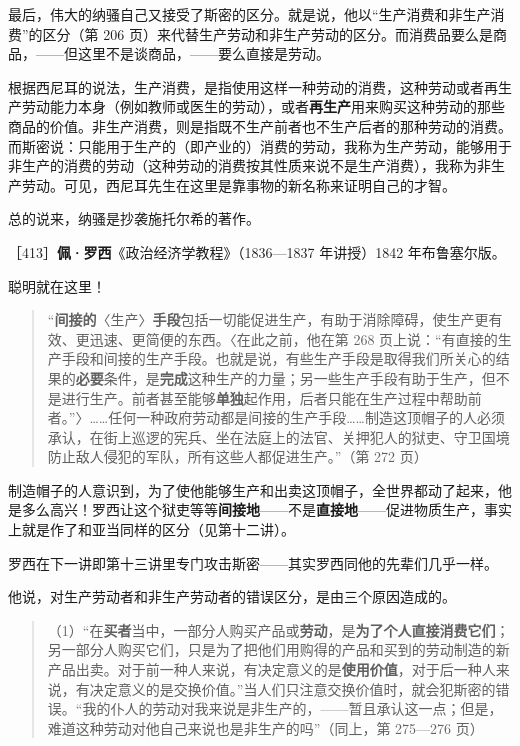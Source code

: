 最后，伟大的纳骚自己又接受了斯密的区分。就是说，他以“生产消费和非生产消费”的区分（第 206 页）来代替生产劳动和非生产劳动的区分。而消费品要么是商品，——但这里不是谈商品，——要么直接是劳动。

根据西尼耳的说法，生产消费，是指使用这样一种劳动的消费，这种劳动或者再生产劳动能力本身（例如教师或医生的劳动），或者\textbf{再生产}用来购买这种劳动的那些商品的价值。非生产消费，则是指既不生产前者也不生产后者的那种劳动的消费。而斯密说：只能用于生产的（即产业的）消费的劳动，我称为生产劳动，能够用于非生产的消费的劳动（这种劳动的消费按其性质来说不是生产消费），我称为非生产劳动。可见，西尼耳先生在这里是靠事物的新名称来证明自己的才智。

总的说来，纳骚是抄袭施托尔希的著作。


［413］\textbf{佩·罗西}《政治经济学教程》（1836—1837 年讲授）1842 年布鲁塞尔版。

聪明就在这里！

\begin{quote}“\textbf{间接的}〈生产〉\textbf{手段}包括一切能促进生产，有助于消除障碍，使生产更有效、更迅速、更简便的东西。〈在此之前，他在第 268 页上说：“有直接的生产手段和间接的生产手段。也就是说，有些生产手段是取得我们所关心的结果的\textbf{必要}条件，是\textbf{完成}这种生产的力量；另一些生产手段有助于生产，但不是进行生产。前者甚至能够\textbf{单独}起作用，后者只能在生产过程中帮助前者。”〉……任何一种政府劳动都是间接的生产手段……制造这顶帽子的人必须承认，在街上巡逻的宪兵、坐在法庭上的法官、关押犯人的狱吏、守卫国境防止敌人侵犯的军队，所有这些人都促进生产。”（第 272 页）\end{quote}

制造帽子的人意识到，为了使他能够生产和出卖这顶帽子，全世界都动了起来，他是多么高兴！罗西让这个狱吏等等\textbf{间接地}——不是\textbf{直接地}——促进物质生产，事实上就是作了和亚当同样的区分（见第十二讲）。

罗西在下一讲即第十三讲里专门攻击斯密——其实罗西同他的先辈们几乎一样。

他说，对生产劳动者和非生产劳动者的错误区分，是由三个原因造成的。

\begin{quote}（1）“在\textbf{买者}当中，一部分人购买产品或\textbf{劳动}，是\textbf{为了个人直接消费它们}；另一部分人购买它们，只是为了把他们用购得的产品和买到的劳动制造的新产品出卖。对于前一种人来说，有决定意义的是\textbf{使用价值}，对于后一种人来说，有决定意义的是交换价值。”当人们只注意交换价值时，就会犯斯密的错误。“我的仆人的劳动对我来说是非生产的，——暂且承认这一点；但是，难道这种劳动对他自己来说也是非生产的吗”（同上，第 275—276 页）\end{quote}


